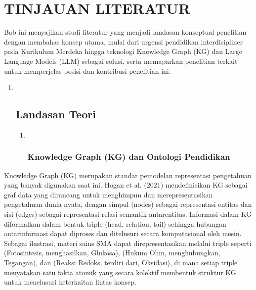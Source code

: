 \documentclass[
]{article}
\begin{document}
\hypertarget{tinjauan-literatur}{%
\section{\texorpdfstring{\hfill\break
TINJAUAN LITERATUR}{ TINJAUAN LITERATUR}}\label{tinjauan-literatur}}

Bab ini menyajikan studi literatur yang menjadi landasan konseptual
penelitian dengan membahas konsep utama, mulai dari urgensi pendidikan
interdisipliner pada Kurikulum Merdeka hingga teknologi Knowledge Graph
(KG) dan Large Language Models (LLM) sebagai solusi, serta memaparkan
penelitian terkait untuk memperjelas posisi dan kontribusi penelitian
ini.

\begin{enumerate}
\def\labelenumi{\arabic{enumi}.}
\item ~
  \hypertarget{landasan-teori}{%
  \subsection{Landasan Teori}\label{landasan-teori}}

  \begin{enumerate}
  \def\labelenumii{\arabic{enumii}.}
  \item ~
    \hypertarget{knowledge-graph-kg-dan-ontologi-pendidikan}{%
    \subsubsection{Knowledge Graph (KG) dan Ontologi
    Pendidikan}\label{knowledge-graph-kg-dan-ontologi-pendidikan}}
  \end{enumerate}
\end{enumerate}

Knowledge Graph (KG) merupakan standar pemodelan representasi
pengetahuan yang banyak digunakan saat ini. Hogan et al. (2021)
mendefinisikan KG sebagai graf data yang dirancang untuk menghimpun dan
merepresentasikan pengetahuan dunia nyata, dengan simpul (nodes) sebagai
representasi entitas dan sisi (edges) sebagai representasi relasi
semantik antarentitas. Informasi dalam KG diformalkan dalam bentuk
triple (head, relation, tail) sehingga hubungan antarinformasi dapat
diproses dan ditelusuri secara komputasional oleh mesin. Sebagai
ilustrasi, materi sains SMA dapat direpresentasikan melalui triple
seperti (Fotosintesis, menghasilkan, Glukosa), (Hukum Ohm,
menghubungkan, Tegangan), dan (Reaksi Redoks, terdiri dari, Oksidasi),
di mana setiap triple menyatakan satu fakta atomik yang secara kolektif
membentuk struktur KG untuk menelusuri keterkaitan lintas konsep.
\end{document}
